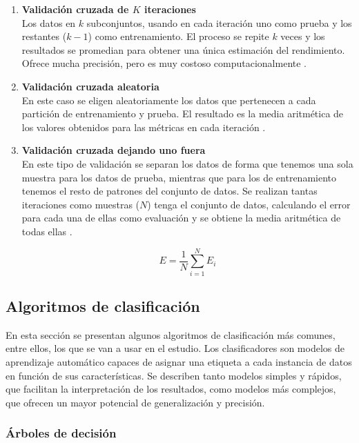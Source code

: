 \begin{enumerate}
	\item \textbf{Validación cruzada de $K$ iteraciones} \\
		Los datos en $k$ subconjuntos, usando en cada iteración uno como prueba y los restantes ($k-1$) como entrenamiento. El proceso se repite $k$ veces y los resultados se promedian para obtener una única estimación del rendimiento. Ofrece mucha precisión, pero es muy costoso computacionalmente \cite{crossval1}.
	\newpage
	\item \textbf{Validación cruzada aleatoria} \\
		En este caso se eligen aleatoriamente los datos que pertenecen a cada partición de entrenamiento y prueba. El resultado es la media aritmética de los valores obtenidos para las métricas en cada iteración \cite{crossval2}.
	\item \textbf{Validación cruzada dejando uno fuera} \\
		En este tipo de validación se separan los datos de forma que tenemos una sola muestra para los datos de prueba, mientras que para los de entrenamiento tenemos el resto de patrones del conjunto de datos. Se realizan tantas iteraciones como muestras ($N$) tenga el conjunto de datos, calculando el error para cada una de ellas como evaluación y se obtiene la media aritmética de todas ellas \cite{crossval3}.

		\[
			E = \frac{1}{N} \sum_{i=1}^{N} E_{i}
		\]
\end{enumerate}

\subsection{Algoritmos de clasificación}
\label{subsec:clasificacion}

En esta sección se presentan algunos algoritmos de clasificación más comunes, entre ellos, los que se van a usar en el estudio. Los clasificadores son modelos de aprendizaje automático capaces de asignar una etiqueta a cada instancia de datos en función de sus características. Se describen tanto modelos simples y rápidos, que facilitan la interpretación de los resultados, como modelos más complejos, que ofrecen un mayor potencial de generalización y precisión.

\subsubsection{Árboles de decisión}
\label{subsubsec:arboles}

